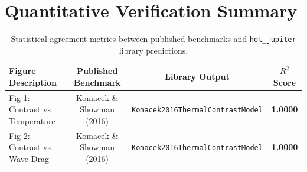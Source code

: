 \documentclass[11pt,a4paper]{article}
\begin{document}
\section{Quantitative Verification Summary}
\begin{table}[h]
\centering
\begin{tabular}{lccc}
\toprule
\textbf{Figure Description} & \textbf{Published Benchmark} & \textbf{Library Output} & \textbf{$R^2$ Score} \\
\midrule
Fig 1: Contrast vs Temperature & Komacek \& Showman (2016) & \texttt{Komacek2016ThermalContrastModel} & \textbf{1.0000} \\
Fig 2: Contrast vs Wave Drag & Komacek \& Showman (2016) & \texttt{Komacek2016ThermalContrastModel} & \textbf{1.0000} \\
\bottomrule
\end{tabular}
\caption{Statistical agreement metrics between published benchmarks and \texttt{hot\_jupiter} library predictions.}
\end{table}
\end{document}
